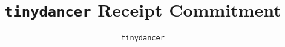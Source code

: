 \documentclass[letterpaper,11pt]{article}
\begin{document}
\title{\texttt{tinydancer} Receipt Commitment}
\author{\texttt{tinydancer}}
\date{}

\maketitle

\vspace{-15mm}





\newpage


\end{document}

